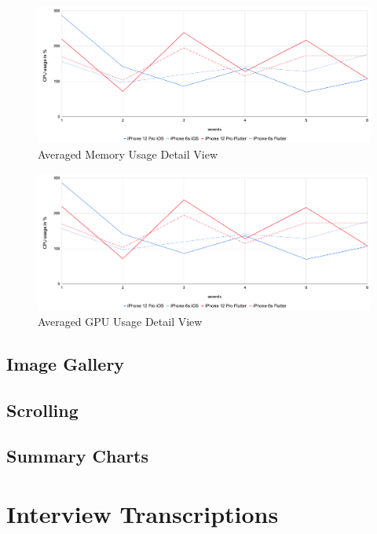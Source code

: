 \begin{figure}
    \centering
    \includegraphics[width=\linewidth]{images/performance_results/detail_view/avg_cpu_usage_detail_view.png}
    \caption{Averaged Memory Usage Detail View}
    \label{fig:avg_memory_usage_detail_view}
\end{figure}

\begin{figure}
    \centering
    \includegraphics[width=\linewidth]{images/performance_results/detail_view/avg_cpu_usage_detail_view.png}
    \caption{Averaged GPU Usage Detail View}
    \label{fig:avg_gpu_usage_detail_view}
\end{figure}



\subsection{Image Gallery}


\subsection{Scrolling}


\subsection{Summary Charts}



\section{Interview Transcriptions}

